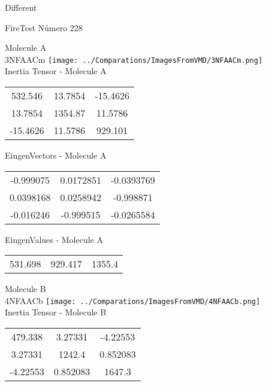 \begin{center}
\vtab
\vtab
\textcolor{NavyBlue}{\Large Different}
\end{center}

 \newpage

\vtab[-2cm]
\begin{center}
{\large FireTest \tab Número 228}
\end{center}
\begin{multicols}{2}
\begin{center}

Molecule A \\ 
3NFAACm
\texttt{[image: ../Comparations/ImagesFromVMD/3NFAACm.png]}
\\
Inertia Tensor - Molecule A \\
\vtab

\begin{tabular}{|c c c|}
532.546	 & 	13.7854	 & 	-15.4626	 \\
13.7854	 & 	1354.87	 & 	11.5786	 \\
-15.4626	 & 	11.5786	 & 	929.101
\end{tabular}

\vtab
 EingenVectors - Molecule A     \\
\vtab
\begin{tabular}{|c c c|}
-0.999075	 & 	0.0172851	 & 	-0.0393769	 \\
0.0398168	 & 	0.0258942	 & 	-0.998871	 \\
-0.016246	 & 	-0.999515	 & 	-0.0265584
\end{tabular}

\vtab
 EingenValues - Molecule A     \\
\vtab
\begin{tabular}{|c c c|}
531.698	 & 	929.417	 & 	1355.4	 \\
\end{tabular}
\columnbreak

Molecule B \\ 
4NFAACb
\texttt{[image: ../Comparations/ImagesFromVMD/4NFAACb.png]}
\\
Inertia Tensor - Molecule B \\
\vtab

\begin{tabular}{|c c c|}
479.338	 & 	3.27331	 & 	-4.22553	 \\
3.27331	 & 	1242.4	 & 	0.852083	 \\
-4.22553	 & 	0.852083	 & 	1647.3
\end{tabular}


\end{center}
\end{multicols}
